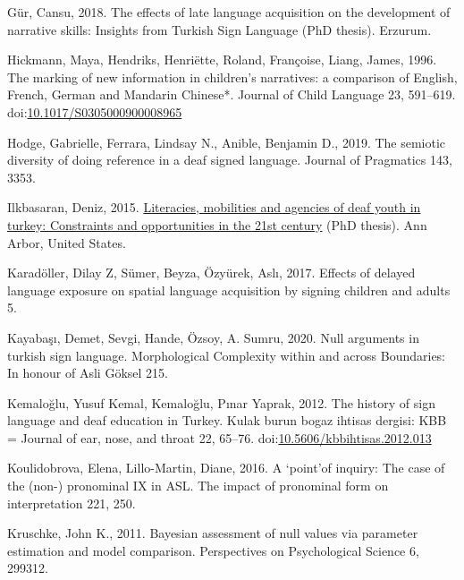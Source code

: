 \documentclass[]{elsarticle} %
\newlength{\cslhangindent}
\newenvironment{CSLReferences}[2] %
 {%
  \setlength{\parindent}{0pt}
  \ifodd #1 \everypar{\setlength{\hangindent}{\cslhangindent}}\ignorespaces\fi
  \ifnum #2 > 0
  \setlength{\parskip}{#2\baselineskip}
  \fi
 }%
 {}
\begin{document}
\begin{CSLReferences}{1}{0}
\leavevmode{}%
Gür, Cansu, 2018. The effects of late language acquisition on the
development of narrative skills: Insights from Turkish Sign Language
(PhD thesis). Erzurum.

\leavevmode{}%
Hickmann, Maya, Hendriks, Henriëtte, Roland, Françoise, Liang, James,
1996. The marking of new information in children's narratives: a
comparison of English, French, German and Mandarin Chinese*. Journal of
Child Language 23, 591--619.
doi:\href{https://doi.org/10.1017/S0305000900008965}{10.1017/S0305000900008965}

\leavevmode{}%
Hodge, Gabrielle, Ferrara, Lindsay N., Anible, Benjamin D., 2019. The
semiotic diversity of doing reference in a deaf signed language. Journal
of Pragmatics 143, 3353.

\leavevmode{}%
Ilkbasaran, Deniz, 2015.
\href{https://www.proquest.com/docview/1656169535/abstract/16EA71911A644FC3PQ/1}{Literacies,
mobilities and agencies of deaf youth in turkey: Constraints and
opportunities in the 21st century} (PhD thesis). Ann Arbor, United
States.

\leavevmode{}%
Karadöller, Dilay Z, Sümer, Beyza, Özyürek, Aslı, 2017. Effects of
delayed language exposure on spatial language acquisition by signing
children and adults 5.

\leavevmode{}%
Kayabaşı, Demet, Sevgi, Hande, Özsoy, A. Sumru, 2020. Null arguments in
turkish sign language. Morphological Complexity within and across
Boundaries: In honour of Asli Göksel 215.

\leavevmode{}%
Kemaloğlu, Yusuf Kemal, Kemaloğlu, Pınar Yaprak, 2012. The history of
sign language and deaf education in Turkey. Kulak burun bogaz ihtisas
dergisi: KBB = Journal of ear, nose, and throat 22, 65--76.
doi:\href{https://doi.org/10.5606/kbbihtisas.2012.013}{10.5606/kbbihtisas.2012.013}

\leavevmode{}%
Koulidobrova, Elena, Lillo-Martin, Diane, 2016. A {`}point{'}of inquiry:
The case of the (non-) pronominal IX in ASL. The impact of pronominal
form on interpretation 221, 250.

\leavevmode{}%
Kruschke, John K., 2011. Bayesian assessment of null values via
parameter estimation and model comparison. Perspectives on Psychological
Science 6, 299312.


\end{CSLReferences}
\end{document}
